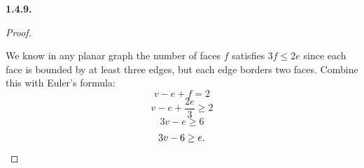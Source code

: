 \documentclass[10pt,]{book}
\theoremstyle{plain}
\theoremstyle{definition}
\theoremstyle{definition}
\theoremstyle{definition}
\theoremstyle{definition}
\numberwithin{equation}{chapter}
\begin{document}
\par\smallskip
\noindent\textbf{1.4.9.} \begin{proof}\hypertarget{proof-9}{}
\hypertarget{p-300}{}%
We know in any planar graph the number of faces \(f\) satisfies \(3f \le 2e\) since each face is bounded by at least three edges, but each edge borders two faces. Combine this with Euler's formula:%
\begin{equation*}
v - e + f = 2
\end{equation*}
%
\begin{equation*}
v - e + \frac{2e}{3} \ge 2
\end{equation*}
%
\begin{equation*}
3v - e \ge 6
\end{equation*}
%
\begin{equation*}
3v - 6 \ge e.\qedhere
\end{equation*}
%
\end{proof}
\par\smallskip
\end{document}
